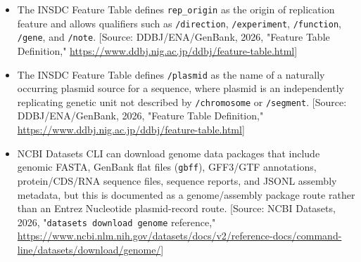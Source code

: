 \documentclass[11pt]{report}
\begin{document}
\begin{itemize}
\item The INSDC Feature Table defines \texttt{rep\_origin} as the origin of replication feature and allows qualifiers such as \texttt{/direction}, \texttt{/experiment}, \texttt{/function}, \texttt{/gene}, and \texttt{/note}. [Source: DDBJ/ENA/GenBank, 2026, "Feature Table Definition," \url{https://www.ddbj.nig.ac.jp/ddbj/feature-table.html}]
\item The INSDC Feature Table defines \texttt{/plasmid} as the name of a naturally occurring plasmid source for a sequence, where plasmid is an independently replicating genetic unit not described by \texttt{/chromosome} or \texttt{/segment}. [Source: DDBJ/ENA/GenBank, 2026, "Feature Table Definition," \url{https://www.ddbj.nig.ac.jp/ddbj/feature-table.html}]
\item NCBI Datasets CLI can download genome data packages that include genomic FASTA, GenBank flat files (\texttt{gbff}), GFF3/GTF annotations, protein/CDS/RNA sequence files, sequence reports, and JSONL assembly metadata, but this is documented as a genome/assembly package route rather than an Entrez Nucleotide plasmid-record route. [Source: NCBI Datasets, 2026, "\texttt{datasets download genome} reference," \url{https://www.ncbi.nlm.nih.gov/datasets/docs/v2/reference-docs/command-line/datasets/download/genome/}]
\end{itemize}
\end{document}
